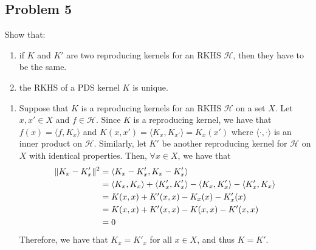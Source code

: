 \documentclass[12pt]{article}
\begin{document}
\subsection*{Problem 5} %
\begin{mdframed}
    Show that:
    \begin{enumerate}[topsep=0pt, partopsep=0pt, itemsep=0pt, label=(\roman*)]
        \item if $K$ and $K'$ are two reproducing kernels for an RKHS $\mathcal{H}$, 
            then they have to be the same. \\
        \item the RKHS of a PDS kernel $K$ is unique.
    \end{enumerate}
\end{mdframed}

\begin{enumerate}[topsep=0pt, partopsep=0pt, itemsep=0pt, label=(\roman*)]
    \item Suppose that $K$ is a reproducing kernels for an RKHS $\mathcal{H}$ on a set $X$. 
        Let $x,x'\in X$ and $f\in \mathcal{H}$. Since $K$ is a reproducing kernel, we have that 
        $f(x)=\langle f, K_x\rangle$ and $K(x,x') = \langle K_x, K_{x'}\rangle = K_x(x')$ where 
        $\langle \cdot,\cdot\rangle$ is an inner product on $\mathcal{H}$. 
        Similarly, let $K'$ be another reproducing kernel for $\mathcal{H}$ on $X$ with identical 
        properties. Then, $\forall x \in X$, we have that
        \begin{align*}
            \|K_x - K'_x\|^2 &= \langle K_x - K'_x,K_x - K'_x\rangle \\
            &= \langle K_x,K_x\rangle+\langle K'_x,K'_x\rangle-\langle K_x,K'_x\rangle-\langle K'_x,K_x\rangle \\ 
            &= K(x,x)+K'(x,x)-K_x(x)-K'_x(x) \\
            &= K(x,x)+K'(x,x)-K(x,x)-K'(x,x) \\
            &=0
        \end{align*}
        Therefore, we have that $K_x = K'_x$ for all $x \in X$, and thus $K=K'$.


\end{enumerate}
\end{document}
